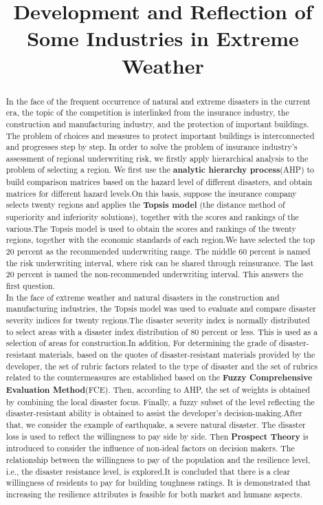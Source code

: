 \documentclass{mcmthesis}
\title{Development and Reflection of Some Industries in Extreme Weather}
\begin{document}
\begin{abstract}
In the face of the frequent occurrence of natural and extreme disasters in the current era, the topic of the competition is interlinked from the insurance industry, the construction and manufacturing industry, and the protection of important buildings. The problem of choices and measures to protect important buildings is interconnected and progresses step by step. In order to solve the problem of insurance industry's assessment of regional underwriting risk, we firstly apply hierarchical analysis to the problem of selecting a region. We first use the \textbf{analytic hierarchy process}(AHP) to build comparison matrices based on the hazard level of different disasters, and obtain matrices for different hazard levels.On this basis, suppose the insurance company selects twenty regions and applies the \textbf{Topsis model} (the distance method of superiority and inferiority solutions), together with the scores and rankings of the various.The Topsis model is used to obtain the scores and rankings of the twenty regions, together with the economic standards of each region.We have selected the top 20 percent as the recommended underwriting range. The middle 60 percent is named the risk underwriting interval, where risk can be shared through reinsurance. The last 20 percent is named the non-recommended underwriting interval. This answers the first question.
\\
In the face of extreme weather and natural disasters in the construction and manufacturing industries, the Topsis model was used to evaluate and compare disaster severity indices for twenty regions.The disaster severity index is normally distributed to select areas with a disaster index distribution of 80 percent or less. This is used as a selection of areas for construction.In addition, For determining the grade of disaster-resistant materials, based on the quotes of disaster-resistant materials provided by the developer, the set of rubric factors related to the type of disaster and the set of rubrics related to the countermeasures are established based on the \textbf{Fuzzy Comprehensive Evaluation Method}(FCE). Then, according to AHP, the set of weights is obtained by combining the local disaster focus. Finally, a fuzzy subset of the level reflecting the disaster-resistant ability is obtained to assist the developer's decision-making.After that, we consider the example of earthquake, a severe natural disaster. The disaster loss is used to reflect the willingness to pay side by side. Then \textbf{Prospect Theory} is introduced to consider the influence of non-ideal factors on decision makers. The relationship between the willingness to pay of the population and the resilience level, i.e., the disaster resistance level, is explored.It is concluded that there is a clear willingness of residents to pay for building toughness ratings. It is demonstrated that increasing the resilience attributes is feasible for both market and humane aspects.

\end{abstract}
\end{document}
